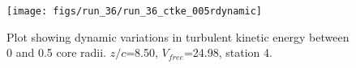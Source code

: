 \begin{figure}[H]
\centering
\texttt{[image: figs/run\_36/run\_36\_ctke\_005rdynamic]}
\caption{Plot showing dynamic variations in turbulent kinetic energy between 0 and 0.5 core radii. $z/c$=8.50, $V_{free}$=24.98, station 4.}
\label{fig:run_36_ctke_005rdynamic}
\end{figure}


